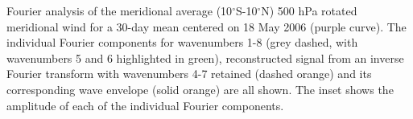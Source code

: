 \label{fig:transform}
Fourier analysis of the meridional average (10$^{\circ}$S-10$^{\circ}$N) 500 hPa rotated meridional wind for a 30-day mean centered on 18 May 2006 (purple curve). The individual Fourier components for wavenumbers 1-8 (grey dashed, with wavenumbers 5 and 6 highlighted in green), reconstructed signal from an inverse Fourier transform with wavenumbers 4-7 retained (dashed orange) and its corresponding wave envelope (solid orange) are all shown. The inset shows the amplitude of each of the individual Fourier components. 
